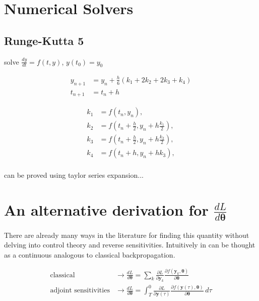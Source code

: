 \documentclass{article}
\begin{document}
    \section{Numerical Solvers}

    \subsection{Runge-Kutta 5}

    solve $\frac{dy}{dt} = f(t,y)$, $y(t_0) = y_0 $

    \begin{align*}
        y_{n+1} &= y_n + \frac{h}{6}(k_1 + 2k_2 +2k_3 + k_4)  \\
        t_{n+1} &= t_n + h
    \end{align*}

    \begin{align*}
        k_{1} &= f(t_{n}, y_{n}), \\
        k_{2} &= f(t_{n} + \frac{h}{2}, y_{n} + h \frac{ k_{1} }{ 2 } ),    \\
        k_{3} &= f(t_{n} + \frac{h}{2}, y_{n} + h \frac{ k_{2} }{ 2 } ),  \\
        k_{4} &= f(t_{n} + h, y_{n} + hk_3), \\
    \end{align*}

    can be proved using taylor series expansion...


    \section{An alternative derivation for $\frac{dL}{d \pmb{\theta}}$}
    \label{adjoint_proof}
    There are already many ways in the literature for finding this quantity without delving into control theory and reverse sensitivities.
    Intuitively in can be thought as a continuous analogous to classical backpropagation.

    \begin{align}
        \text{classical} &\to
        \frac{d L}{ d \pmb{\theta}} =
        \sum_k
        \frac{\partial L}{\partial \pmb{y}_{k}}
        \frac{\partial f(\pmb{y}_k, \pmb\theta)}{\partial \pmb{\theta}}
        \\
        \text{adjoint sensitivities} &\to
        \frac{d L}{ d \pmb{\theta}} =
        \int_T^0
        \frac{\partial L}{\partial \pmb{y}(\tau)}
        \frac{\partial f(\pmb{y}(\tau), \pmb{\theta})}{\partial \pmb{\theta}} \, d\tau
    \end{align}
\end{document}
